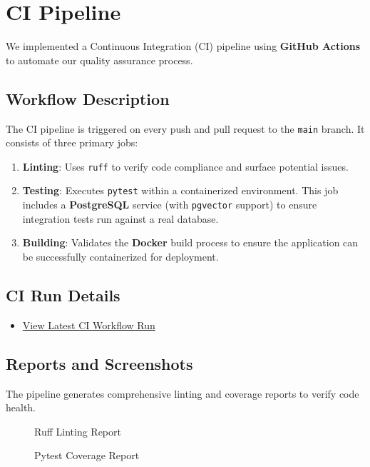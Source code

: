 \documentclass[12pt,a4paper]{article}
\begin{document}
\section{CI Pipeline}
We implemented a Continuous Integration (CI) pipeline using \textbf{GitHub Actions} to automate our quality assurance process.

\subsection{Workflow Description}
The CI pipeline is triggered on every push and pull request to the \texttt{main} branch. It consists of three primary jobs:
\begin{enumerate}
    \item \textbf{Linting}: Uses \texttt{ruff} to verify code compliance and surface potential issues.
    \item \textbf{Testing}: Executes \texttt{pytest} within a containerized environment. This job includes a \textbf{PostgreSQL} service (with \texttt{pgvector} support) to ensure integration tests run against a real database.
    \item \textbf{Building}: Validates the \textbf{Docker} build process to ensure the application can be successfully containerized for deployment.
\end{enumerate}

\subsection{CI Run Details}
\begin{itemize}
    \item \href{https://github.com/Potter32111/poetry-recommender/actions}{View Latest CI Workflow Run}
\end{itemize}

\subsection{Reports and Screenshots}
The pipeline generates comprehensive linting and coverage reports to verify code health.

\begin{figure}[h]
    \centering
    \caption{Ruff Linting Report}
    \label{fig:lint_report}
\end{figure}

\begin{figure}[h]
    \centering
    \caption{Pytest Coverage Report}
    \label{fig:coverage_report}
\end{figure}
\end{document}
